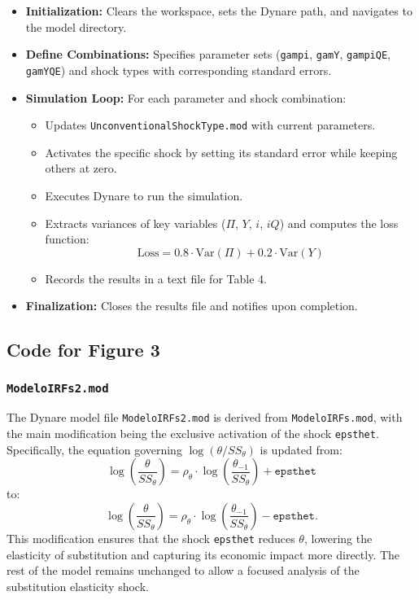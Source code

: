 \documentclass[12pt]{article}
\begin{document}
\begin{itemize}
    \item \textbf{Initialization:} Clears the workspace, sets the Dynare path, and navigates to the model directory.
    \item \textbf{Define Combinations:} Specifies parameter sets (\texttt{gampi}, \texttt{gamY}, \texttt{gampiQE}, \texttt{gamYQE}) and shock types with corresponding standard errors.
    \item \textbf{Simulation Loop:} For each parameter and shock combination:
    \begin{itemize}
        \item Updates \texttt{UnconventionalShockType.mod} with current parameters.
        \item Activates the specific shock by setting its standard error while keeping others at zero.
        \item Executes Dynare to run the simulation.
        \item Extracts variances of key variables (\(\Pi\), \(Y\), \(i\), \(iQ\)) and computes the loss function:
        \[
        \text{Loss} = 0.8 \cdot \text{Var}(\Pi) + 0.2 \cdot \text{Var}(Y)
        \]
        \item Records the results in a text file for Table 4.
    \end{itemize}
    \item \textbf{Finalization:} Closes the results file and notifies upon completion.
\end{itemize}


\subsection{Code for Figure 3}

\subsubsection{\texttt{ModeloIRFs2.mod}}

The Dynare model file \texttt{ModeloIRFs2.mod} is derived from \texttt{ModeloIRFs.mod}, with the main modification being the exclusive activation of the shock \texttt{epsthet}. Specifically, the equation governing \(\log(\theta / SS_\theta)\) is updated from:
\[
\log\left(\frac{\theta}{SS_\theta}\right) = \rho_\theta \cdot \log\left(\frac{\theta_{-1}}{SS_\theta}\right) + \texttt{epsthet}
\]
to:
\[
\log\left(\frac{\theta}{SS_\theta}\right) = \rho_\theta \cdot \log\left(\frac{\theta_{-1}}{SS_\theta}\right) - \texttt{epsthet}.
\]
This modification ensures that the shock \texttt{epsthet} reduces \(\theta\), lowering the elasticity of substitution and capturing its economic impact more directly. The rest of the model remains unchanged to allow a focused analysis of the substitution elasticity shock.
\end{document}
